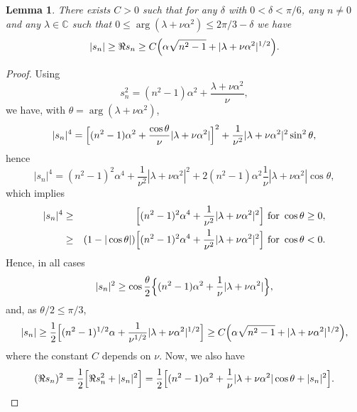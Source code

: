 \documentclass[11pt]{article}
\newtheorem{lemma}[theorem]{Lemma}
\begin{document}
\begin{lemma} \label{lemme30}
There exists $C>0$ such that
for any $\delta$ with $0<\delta <\pi /6$, any $n\neq 0$ and any $\lambda
\in \mathbb{C}$ such that $0\leq \arg (\lambda +\nu \alpha ^{2})\leq 2\pi
/3-\delta$ 
we have
\begin{eqnarray*}
|s_{n}| \geq \Re s_n \geq C \Bigl( \alpha \sqrt{n^{2}-1}+|\lambda +\nu \alpha ^{2}|^{1/2} \Bigr). 
\end{eqnarray*}
\end{lemma}

\begin{proof} Using
$$
s_n^2 = (n^2 - 1) \alpha^2 + \frac{\lambda + \nu \alpha^2}{\nu},
$$
we have, with $\theta = \arg (\lambda +\nu \alpha ^{2})$,
\begin{equation*}
|s_{n}|^{4}=\Bigl[(n^{2}-1)\alpha ^{2}+\frac{\cos \theta }{\nu }|\lambda +\nu
\alpha ^{2}|\Bigr]^{2}+\frac{1}{\nu ^{2}}|\lambda +\nu \alpha ^{2}|^{2}\sin
^{2}\theta ,
\end{equation*}%
hence
\begin{equation*}
|s_{n}|^{4}=(n^{2}-1)^{2}\alpha ^{4}+\frac{1}{\nu ^{2}}|\lambda +\nu \alpha
^{2}|^{2}+2(n^{2}-1)\alpha ^{2}\frac{1}{\nu }|\lambda +\nu \alpha ^{2}|\cos
\theta ,
\end{equation*}%
which implies%
\begin{eqnarray*}
|s_{n}|^{4} &\geq &\Bigl[(n^{2}-1)^{2}\alpha ^{4}+\frac{1}{\nu ^{2}}|\lambda
+\nu \alpha ^{2}|^{2}\Bigr]\text{ for }\cos \theta \geq 0, \\
&\geq &(1-|\cos \theta |)\Bigl[(n^{2}-1)^{2}\alpha ^{4}+\frac{1}{\nu ^{2}}%
|\lambda +\nu \alpha ^{2}|^{2}\Bigr] \text{ for }\cos \theta <0.
\end{eqnarray*}%
Hence, in all cases%
\begin{equation}
|s_{n}|^{2}\geq \cos \frac{\theta}{2}\Bigl\{(n^{2}-1)\alpha ^{2}+\frac{1}{\nu }|\lambda
+\nu \alpha ^{2}|\Bigr\},  \label{bound sn^2}
\end{equation}%
and, as $\theta/2 \le \pi/3$,
$$
|s_{n}| \geq \frac{1}{2} \Bigl[(n^{2}-1)^{1/2}\alpha +\frac{1}{\nu ^{1/2}}%
|\lambda +\nu \alpha ^{2}|^{1/2}\Bigr] 
\geq C \Bigl( \alpha \sqrt{n^{2}-1}+|\lambda +\nu \alpha ^{2}|^{1/2} \Bigr),
$$
where the constant $C$ depends on $\nu$.
Now, we also have%
\begin{equation*}
(\Re s_{n})^{2}= \frac{1}{2} \Bigl[ \Re s_n^2 + |s_n|^2 \Bigr] 
= \frac{1}{2}\Bigl[(n^{2}-1)\alpha ^{2}+\frac{1}{\nu }|\lambda
+\nu \alpha ^{2}|\cos \theta +|s_{n}|^{2}\Bigr].

\end{equation*}
\end{proof}
\end{document}

